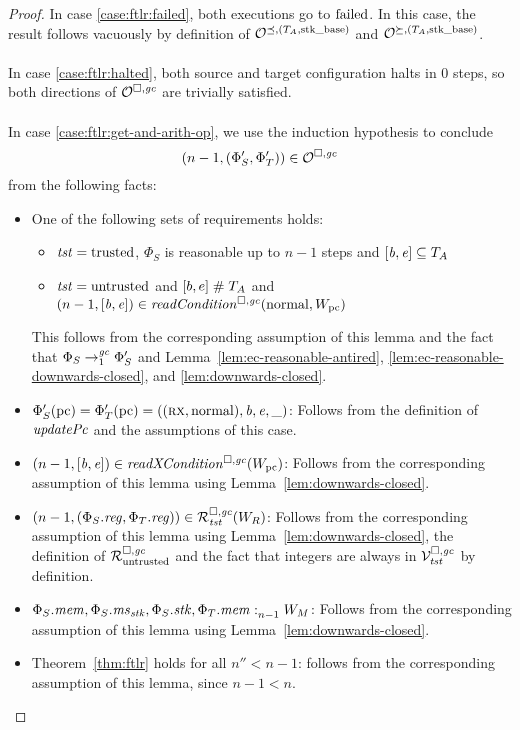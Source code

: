 \begin{proof}
  In case \ref{case:ftlr:failed}, both executions go to $\failed$.
  In this case, the result follows vacuously by definition of $\lrol$ and $\lror$.
  \\\\
  In case \ref{case:ftlr:halted}, both source and target configuration halts in 0
  steps, so both directions of $\lro$ are trivially satisfied.
  \\\\
  In case \ref{case:ftlr:get-and-arith-op}, we use the induction hypothesis to conclude
  \[
    \npair[n-1]{(\Phi_S',\Phi_T')} \in \lro
  \]
  from the following facts:
  \begin{itemize}
  \item One of the following sets of requirements holds:
    \begin{itemize}
    \item $\trust = \trusted$, $\Phi_S$ is reasonable up to $n-1$ steps and $[\baddr,\eaddr] \subseteq \ta$
    \item $\trust = \untrusted$ and $[b,e] \mathrel{\#} \ta$ and $\npair[n-1]{[\baddr,\eaddr]} \in \readCond{\normal,W_\pcreg}$
    \end{itemize}
    This follows from the corresponding assumption of this lemma and the fact that $\Phi_S \nstep[1]{\gc} \Phi_S'$ and Lemma~\ref{lem:ec-reasonable-antired}, \ref{lem:ec-reasonable-downwards-closed}, and \ref{lem:downwards-closed}.
  \item $\Phi_S'(\pcreg) = \Phi_T'(\pcreg) = ((\rx,\normal),\baddr,\eaddr,\_)$:
    Follows from the definition of $\updPcAddr{}$ and the assumptions of this case.
  \item $\npair[n-1]{[\baddr,\eaddr]} \in \xReadCond{W_\pcreg}$:
    Follows from the corresponding assumption of this lemma using Lemma~\ref{lem:downwards-closed}.
  \item $\npair[n-1]{(\Phi_S.\reg,\Phi_T.\reg)} \in \lrrg{\trust}(W_R)$:
    Follows from the corresponding assumption of this lemma using Lemma~\ref{lem:downwards-closed}, the definition of $\lrr$ and the fact that integers are always in $\lrvg{\trust}$ by definition.
  \item $\memSat[n-1]{\Phi_S.\mem,\Phi_S.\ms_\stk,\Phi_S.\stk,\Phi_T.\mem}{W_M}$:
    Follows from the corresponding assumption of this lemma using Lemma~\ref{lem:downwards-closed}.
  \item Theorem~\ref{thm:ftlr} holds for all $n'' < n-1$:
    follows from the corresponding assumption of this lemma, since $n - 1 < n$.
  \end{itemize}


\end{proof}
